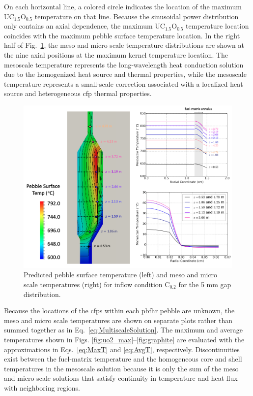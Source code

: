 On each horizontal line, a colored circle indicates the location of the maximum UC$_{1.5}$O$_{0.5}$ temperature on that line. Because the sinusoidal power distribution only contains an axial dependence, the maximum UC$_{1.5}$O$_{0.5}$ temperature location coincides with the maximum pebble surface temperature location. In the right half of Fig.\ \ref{fig:multiscale_fuel}, the meso and micro scale temperature distributions are shown at the nine axial positions at the maximum kernel temperature location. The mesoscale temperature represents the long-wavelength heat conduction solution due to the homogenized heat source and thermal properties, while the mesoscale temperature represents a small-scale correction associated with a localized heat source and heterogeneous \gls{cfp} thermal properties. 

\begin{figure}[h!]
\centering
\includegraphics[width=0.9\linewidth]{figs/multiscale_fuel.png}
\caption{Predicted pebble surface temperature (left) and meso and micro scale temperatures (right) for inflow condition C$_\text{0.2}$ for the 5 \si{\milli\meter} gap distribution. }
\label{fig:multiscale_fuel}
\end{figure}

Because the locations of the \glspl{cfp} within each \gls{pbfhr} pebble are unknown, the meso and micro scale temperatures are shown on separate plots rather than summed together as in Eq.\ \eqref{eq:MultiscaleSolution}. The maximum and average temperatures shown in Figs. \ref{fig:uo2_max}--\ref{fig:graphite} are evaluated with the approximations in Eqs.\ \eqref{eq:MaxT} and \eqref{eq:AvgT}, respectively. Discontinuities exist between the fuel-matrix temperature and the homogeneous core and shell temperatures in the mesoscale solution because it is only the sum of the meso and micro scale solutions that satisfy continuity in temperature and heat flux with neighboring regions.

